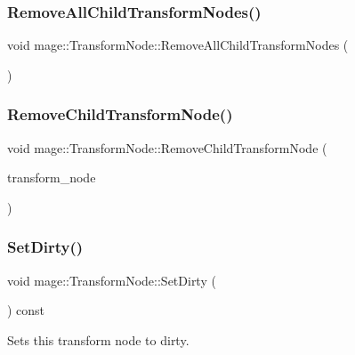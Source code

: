 \subsubsection{\texorpdfstring{Remove\+All\+Child\+Transform\+Nodes()}{RemoveAllChildTransformNodes()}}
{\footnotesize\ttfamily void mage\+::\+Transform\+Node\+::\+Remove\+All\+Child\+Transform\+Nodes (\begin{DoxyParamCaption}{ }\end{DoxyParamCaption})}

\hypertarget{classmage_1_1_transform_node_a972043683e57960b331e7f5bc1dc72a6}{}\label{classmage_1_1_transform_node_a972043683e57960b331e7f5bc1dc72a6} 
\subsubsection{\texorpdfstring{Remove\+Child\+Transform\+Node()}{RemoveChildTransformNode()}}
{\footnotesize\ttfamily void mage\+::\+Transform\+Node\+::\+Remove\+Child\+Transform\+Node (\begin{DoxyParamCaption}\item[{\hyperlink{namespacemage_a1e01ae66713838a7a67d30e44c67703e}{Shared\+Ptr}$<$ \hyperlink{classmage_1_1_transform_node}{Transform\+Node} $>$}]{transform\+\_\+node }\end{DoxyParamCaption})}

\hypertarget{classmage_1_1_transform_node_a333a00b67bde653ffe76b5fa6f240223}{}\label{classmage_1_1_transform_node_a333a00b67bde653ffe76b5fa6f240223} 
\subsubsection{\texorpdfstring{Set\+Dirty()}{SetDirty()}}
{\footnotesize\ttfamily void mage\+::\+Transform\+Node\+::\+Set\+Dirty (\begin{DoxyParamCaption}{ }\end{DoxyParamCaption}) const\hspace{0.3cm}{\ttfamily [private]}}

Sets this transform node to dirty. \hypertarget{classmage_1_1_transform_node_a1f0f355c51e906eabc6aa2a17706ac50}{}\label{classmage_1_1_transform_node_a1f0f355c51e906eabc6aa2a17706ac50} 
